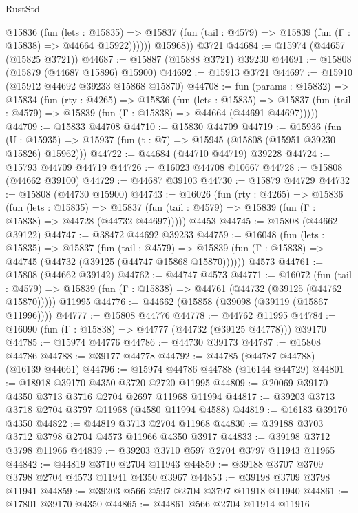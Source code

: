 \begin{lexlean}{RustStd}
\begin{coremodule}
            @15836
              (fun (lets : @15835) =>
              @15837 (fun (tail : @4579) => @15839 (fun (Γ : @15838) => @44664 @15922))))))
        @15968))
    @3721
@44684 := @15974 (@44657 (@15825 @3721))
@44687 := @15887 (@15888 @3721) @39230
@44691 := @15808 (@15879 (@44687 @15896) @15900)
@44692 := @15913 @3721
@44697 := @15910 (@15912 @44692 @39233 @15868 @15870)
@44708 := fun (params : @15832) =>
  @15834
    (fun (rty : @4265) =>
    @15836
      (fun (lets : @15835) =>
      @15837 (fun (tail : @4579) => @15839 (fun (Γ : @15838) => @44664 (@44691 @44697)))))
@44709 := @15833 @44708
@44710 := @15830 @44709
@44719 := @15936
    (fun (U : @15935) => @15937 (fun (t : @7) => @15945 (@15808 (@15951 @39230 @15826) @15962)))
@44722 := @44684 (@44710 @44719) @39228
@44724 := @15793 @44709 @44719
@44726 := @16023 @44708 @10667
@44728 := @15808 (@44662 @39100)
@44729 := @44687 @39103
@44730 := @15879 @44729
@44732 := @15808 (@44730 @15900)
@44743 := @16026
    (fun (rty : @4265) =>
    @15836
      (fun (lets : @15835) =>
      @15837 (fun (tail : @4579) => @15839 (fun (Γ : @15838) => @44728 (@44732 @44697)))))
    @4453
@44745 := @15808 (@44662 @39122)
@44747 := @38472 @44692 @39233
@44759 := @16048
    (fun (lets : @15835) =>
    @15837
      (fun (tail : @4579) =>
      @15839 (fun (Γ : @15838) => @44745 (@44732 (@39125 (@44747 @15868 @15870))))))
    @4573
@44761 := @15808 (@44662 @39142)
@44762 := @44747 @4573
@44771 := @16072
    (fun (tail : @4579) => @15839 (fun (Γ : @15838) => @44761 (@44732 (@39125 (@44762 @15870)))))
    @11995
@44776 := @44662 (@15858 (@39098 (@39119 (@15867 @11996))))
@44777 := @15808 @44776
@44778 := @44762 @11995
@44784 := @16090 (fun (Γ : @15838) => @44777 (@44732 (@39125 @44778))) @39170
@44785 := @15974 @44776
@44786 := @44730 @39173
@44787 := @15808 @44786
@44788 := @39177 @44778
@44792 := @44785 (@44787 @44788) (@16139 @44661)
@44796 := @15974 @44786 @44788 (@16144 @44729)
@44801 := @18918 @39170 @4350 @3720 @2720 @11995
@44809 := @20069 @39170 @4350 @3713 @3716 @2704 @2697 @11968 @11994
@44817 := @39203 @3713 @3718 @2704 @3797 @11968 (@4580 @11994 @4588)
@44819 := @16183 @39170 @4350
@44822 := @44819 @3713 @2704 @11968
@44830 := @39188 @3703 @3712 @3798 @2704 @4573 @11966 @4350 @3917
@44833 := @39198 @3712 @3798 @11966
@44839 := @39203 @3710 @597 @2704 @3797 @11943 @11965
@44842 := @44819 @3710 @2704 @11943
@44850 := @39188 @3707 @3709 @3798 @2704 @4573 @11941 @4350 @3967
@44853 := @39198 @3709 @3798 @11941
@44859 := @39203 @566 @597 @2704 @3797 @11918 @11940
@44861 := @17801 @39170 @4350
@44865 := @44861 @566 @2704 @11914 @11916

\end{coremodule}
\end{lexlean}
